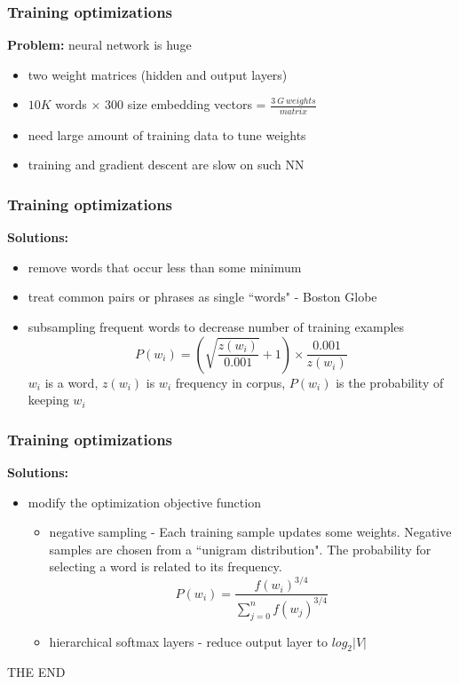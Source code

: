 \documentclass{beamer}   %
\begin{document}

\begin{frame}[t]
\frametitle{Training optimizations}
    \textbf{Problem:} neural network is huge \par
    \begin{itemize}
        \item two weight matrices (hidden and output layers)
        \item $10K$ words $\times$ $300$ size embedding vectors = $\frac{3\ G\ weights}{matrix}$
        \item need large amount of training data to tune weights
        \item training and gradient descent are slow on such NN
    \end{itemize}
\end{frame}


\begin{frame}[t]
\frametitle{Training optimizations}
    \textbf{Solutions:} \par
    \begin{itemize}
        \item remove words that occur less than some minimum
        \item treat common pairs or phrases as single ``words" - Boston Globe
        \item subsampling frequent words to decrease number of training examples
          $$P(w_i) = \left(\sqrt{\frac{z(w_i)}{0.001}} + 1\right) \times \frac{0.001}{z(w_i)}$$
          $w_i$ is a word, $z(w_i)$ is $w_i$ frequency in corpus,
          $P(w_i)$ is the probability of keeping $w_i$ \par
    \end{itemize}
\end{frame}


\begin{frame}[t]
\frametitle{Training optimizations}
    \textbf{Solutions:} \par
    \begin{itemize}
        \item modify the optimization objective function
        \begin{itemize}
            \item negative sampling - Each training sample updates some weights.
                  Negative samples are chosen from a ``unigram distribution".
                  The probability for selecting a word is related to its frequency.
              $$P(w_i) = \frac{f(w_i)^{3/4}}{\sum_{j=0}^{n} f(w_j)^{3/4}}$$
            \item hierarchical softmax layers - reduce output layer to $log_2|V|$
        \end{itemize}
    \end{itemize}
\end{frame}


\begin{frame}
    \centering THE END
\end{frame}

\end{document}
